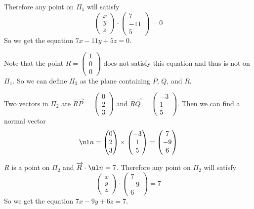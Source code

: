 \documentclass[a4paper]{article}
\begin{document}
Therefore any point on $\Pi_1$ will satisfy $$\begin{pmatrix}x\\ y\\ z\end{pmatrix} \cdot \begin{pmatrix}7\\ -11\\ 5\end{pmatrix} = 0$$
So we get the equation $7x - 11y + 5z = 0$.

Note that the point $R = \begin{pmatrix}1\\ 0\\ 0\end{pmatrix}$ does not satisfy this equation and thus is not on $\Pi_1$. So we can define $\Pi_2$ as the plane containing $P$, $Q$, and $R$.

Two vectors in $\Pi_2$ are $\overrightarrow{RP\,} = \begin{pmatrix}0\\ 2\\ 3\end{pmatrix}$ and $\overrightarrow{RQ\,} = \begin{pmatrix}-3\\ 1\\ 5\end{pmatrix}$. Then we can find a normal vector $$\ul n = \begin{pmatrix}0\\ 2\\ 3\end{pmatrix} \times \begin{pmatrix}-3\\ 1\\ 5\end{pmatrix} = \begin{pmatrix}7\\ -9\\ 6\end{pmatrix}$$

$R$ is a point on $\Pi_2$ and $\overrightarrow{R\,} \cdot \ul n = 7$. Therefore any point on $\Pi_2$ will satisfy $$\begin{pmatrix}x\\ y\\ z\end{pmatrix} \cdot \begin{pmatrix}7\\ -9\\ 6\end{pmatrix} = 7$$
So we get the equation $7x - 9y + 6z = 7$.
\end{document}
